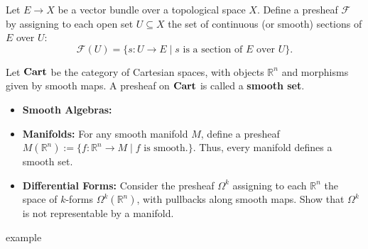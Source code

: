 \begin{example}
Let $E \to X$ be a vector bundle over a topological space $X$. Define a presheaf $\mathcal{F}$ by assigning to each open set $U \subseteq X$ the set of continuous (or smooth) sections of $E$ over $U$:
\[
\mathcal{F}(U) = \{ s : U \to E \mid s \text{ is a section of } E \text{ over } U \}.
\]
\end{example}

\begin{example}
Let $\mathbf{Cart}$ be the category of Cartesian spaces, with objects $\mathbb{R}^n$ and morphisms given by smooth maps. A presheaf on $\mathbf{Cart}$ is called a \textbf{smooth set}.
\begin{itemize}
  \item \textbf{Smooth Algebras: }
  \item \textbf{Manifolds:} For any smooth manifold $M$, define a presheaf $M(\mathbb{R}^n) := \{f: \mathbb{R}^n\to M \mid f \text{ is smooth.}\}$. Thus, every manifold defines a smooth set.
    \item \textbf{Differential Forms:} Consider the presheaf $\Omega^k$ assigning to each $\mathbb{R}^n$ the space of $k$-forms $\Omega^k(\mathbb{R}^n)$, with pullbacks along smooth maps. Show that $\Omega^k$ is not representable by a manifold.
\end{itemize}
\end{example}

\begin{example}
  example
\end{example}

